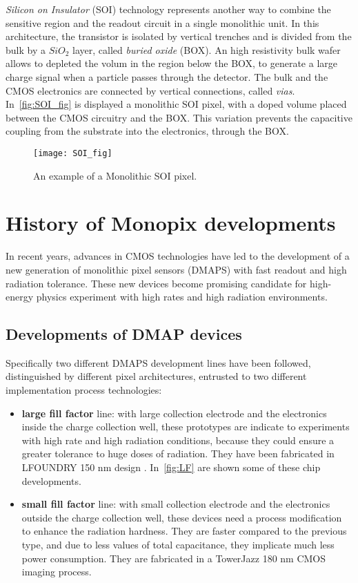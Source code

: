 \textit{Silicon on Insulator} (SOI) technology represents another way to combine the sensitive region and the readout circuit in a single monolithic unit. In this architecture, the transistor is isolated by vertical trenches and is divided from the bulk by a $SiO_{2}$ layer, called \emph{buried oxide} (BOX).
An high resistivity bulk wafer allows to depleted the volum in the region below the BOX, to generate a large charge signal when a particle passes through the detector. The bulk and the CMOS electronics are connected by vertical connections, called \textit{vias}. \\
In~\autoref{fig:SOI_fig} is displayed a monolithic SOI pixel, with a doped volume placed between the CMOS circuitry and the BOX. This variation prevents the capacitive coupling from the substrate into the electronics, through the BOX.

\begin{figure}[h!]
\centering
\texttt{[image: SOI\_fig]}
\caption{An example of a Monolithic SOI pixel.}
\label{fig:SOI_fig}
\end{figure}


\section{History of Monopix developments}

In recent years, advances in CMOS technologies have led to the development of a new generation of monolithic pixel sensors (DMAPS) with fast readout and high radiation tolerance. These new devices become promising candidate for high-energy physics experiment with high rates and high radiation environments.


\subsection{Developments of DMAP devices}

Specifically two different DMAPS development lines have been followed, distinguished by different pixel architectures, entrusted to two different implementation process technologies:


\begin{itemize}
\item \textbf{large fill factor} line: with large collection electrode and the electronics inside the charge collection well, these prototypes are indicate to experiments with high rate and high radiation conditions, because they could ensure a greater tolerance to huge doses of radiation. They have been fabricated in LFOUNDRY 150 nm design \cite{Barbero:2019bkw}. In~\autoref{fig:LF} are shown some of these chip developments.
\item \textbf{small fill factor} line: with small collection electrode and the electronics outside the charge collection well, these devices need a process modification to enhance the radiation hardness. They are faster compared to the previous type, and due to less values of total capacitance, they implicate much less power consumption. They are fabricated in a TowerJazz 180 nm CMOS imaging process.
\end{itemize}

